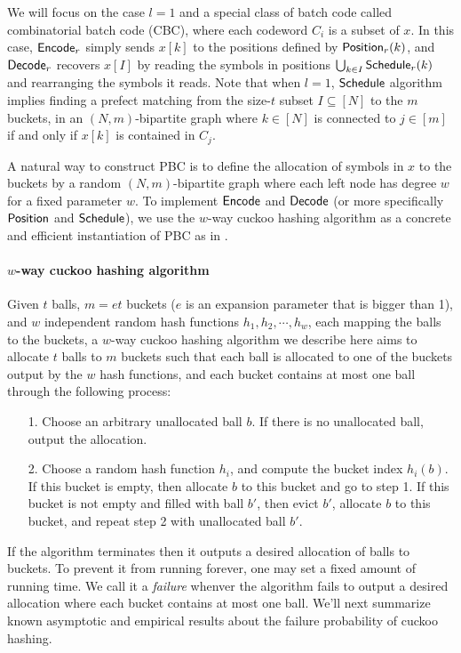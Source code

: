 We will focus on the case $l=1$ and a special class of batch code called combinatorial batch code (CBC)\cite{cryptoeprint:2017/1142,10.1145/1007352.1007396,cryptoeprint:2008/306}, where each codeword $C_i$ is a subset of $x$. In this case, ${\sf Encode}_r$ simply sends $x[k]$ to the positions defined by ${\sf Position}_r(k)$, and ${\sf Decode}_r$ recovers $x[I]$ by reading the symbols in positions $\bigcup_{k\in I}{\sf Schedule}_r(k)$ and rearranging the symbols it reads. Note that when $l=1$, ${\sf Schedule}$ algorithm implies finding a prefect matching from the size-$t$ subset $I\subseteq[N]$ to the $m$ buckets, in an $(N,m)$-bipartite graph where $k\in[N]$ is connected to $j\in[m]$ if and only if $x[k]$ is contained in $C_j$. 

A natural way to construct PBC is to define the allocation of symbols in $x$ to the buckets by a random $(N,m)$-bipartite graph where each left node has degree $w$ for a fixed parameter $w$. To implement ${\sf Encode}$ and ${\sf Decode}$ (or more specifically ${\sf Position}$ and ${\sf Schedule}$), we use the $w$-way cuckoo hashing algorithm\cite{10.1007/3-540-44676-1_10} as a concrete and efficient instantiation of PBC as in \cite{cryptoeprint:2017/1142,cryptoeprint:2018/579,yeo_cuckoo_2023}. 

\paragraph{$w$-way cuckoo hashing algorithm}Given $t$ balls, $m=et$ buckets ($e$ is an expansion parameter that is bigger than 1), and $w$ independent random hash functions $h_1, h_2,\cdots, h_w$, each mapping the balls to the buckets, a $w$-way cuckoo hashing algorithm we describe here aims to allocate $t$ balls to $m$ buckets such that each ball is allocated to one of the buckets output by the $w$ hash functions, and each bucket contains at most one ball through the following process: 
\begin{itemize}
  \item[1.] Choose an arbitrary unallocated ball $b$. If there is no unallocated ball, output the allocation. 
  \item[2.] Choose a random hash function $h_i$, and  compute the bucket index $h_i(b)$. If this bucket is empty, then allocate $b$ to this bucket and go to step 1. If this bucket is not empty and filled with ball $b'$, then evict $b'$, allocate $b$ to this bucket,  and repeat step 2 with unallocated ball $b'$. 
\end{itemize}
If the algorithm terminates then it outputs a desired allocation of balls to buckets. To prevent it from running forever, one may set a fixed amount of running time. We call it a \emph{failure} whenver the algorithm fails to output a desired allocation where each bucket contains at most one ball. We'll next summarize known asymptotic and empirical results about the failure probability of cuckoo hashing. 

